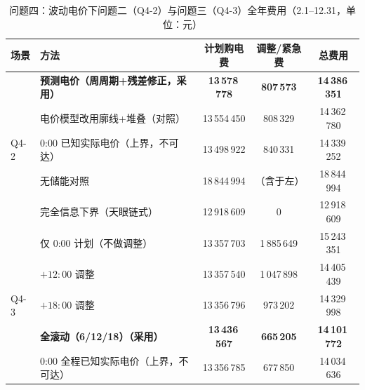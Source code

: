 \documentclass[12pt,a4paper,fontset=fandol]{ctexart}
\begin{document}
\begin{table}[htbp]
\centering
\caption{问题四\nobreak：波动电价下问题二（Q4-2\nobreak）与问题三（Q4-3\nobreak）全年费用（2.1--12.31\nobreak，单位\nobreak：元\nobreak）}
\label{tab:q4cmp}
\begin{tabular}{@{}llccc@{}}
\toprule
场景 & 方法 & 计划购电费 & 调整/紧急费 & 总费用 \\
\midrule
\multirow{5}{*}{Q4-2}
& \textbf{预测电价（周周期+残差修正\nobreak，采用\nobreak）} & \textbf{13\,578\,778} & \textbf{807\,573} & \textbf{14\,386\,351} \\
& 电价模型改用廓线+堆叠（对照\nobreak） & 13\,554\,450 & 808\,329 & 14\,362\,780 \\
& 0:00 已知实际电价（上界\nobreak，不可达\nobreak） & 13\,498\,922 & 840\,331 & 14\,339\,252 \\
& 无储能对照 & 18\,844\,994 & （含于左\nobreak） & 18\,844\,994 \\
& 完全信息下界（天眼链式\nobreak） & 12\,918\,609 & 0 & 12\,918\,609 \\
\midrule
\multirow{5}{*}{Q4-3}
& 仅 0:00 计划（不做调整\nobreak） & 13\,357\,703 & 1\,885\,649 & 15\,243\,351 \\
& $+12{:}00$ 调整 & 13\,357\,540 & 1\,047\,898 & 14\,405\,439 \\
& $+18{:}00$ 调整 & 13\,356\,796 & 973\,202 & 14\,329\,998 \\
& \textbf{全滚动（6/12/18\nobreak）（采用\nobreak）} & \textbf{13\,436\,567} & \textbf{665\,205} & \textbf{14\,101\,772} \\
& 0:00 全程已知实际电价（上界\nobreak，不可达\nobreak） & 13\,356\,785 & 677\,850 & 14\,034\,636 \\
\bottomrule
\end{tabular}
\end{table}
\end{document}
